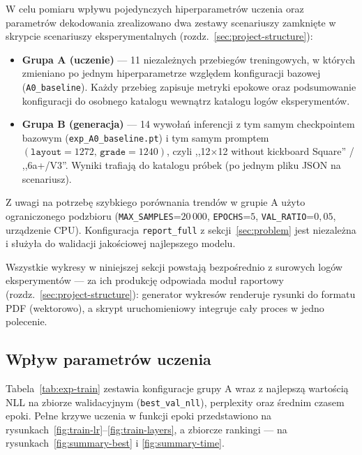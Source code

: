 \documentclass[12pt,a4paper]{article}
\begin{document}
W celu pomiaru wpływu pojedynczych hiperparametrów uczenia oraz parametrów dekodowania zrealizowano dwa zestawy scenariuszy zamknięte w skrypcie scenariuszy eksperymentalnych (rozdz.~\ref{sec:project-structure}):
\begin{itemize}[leftmargin=1.5em]
    \item \textbf{Grupa A (uczenie)} --- 11 niezależnych przebiegów treningowych, w których zmieniano po jednym hiperparametrze względem konfiguracji bazowej (\texttt{A0\_baseline}). Każdy przebieg zapisuje metryki epokowe oraz podsumowanie konfiguracji do osobnego katalogu wewnątrz katalogu logów eksperymentów.
    \item \textbf{Grupa B (generacja)} --- 14 wywołań inferencji z tym samym checkpointem bazowym (\texttt{exp\_A0\_baseline.pt}) i tym samym promptem $(\texttt{layout}=1272,\,\texttt{grade}=1240)$, czyli ,,12$\times$12 without kickboard Square'' / ,,6a+/V3''. Wyniki trafiają do katalogu próbek (po jednym pliku JSON na scenariusz).
\end{itemize}
Z uwagi na potrzebę szybkiego porównania trendów w grupie A użyto ograniczonego podzbioru (\texttt{MAX\_SAMPLES}=$20\,000$, \texttt{EPOCHS}=$5$, \texttt{VAL\_RATIO}=$0{,}05$, urządzenie CPU). Konfiguracja \texttt{report\_full} z sekcji~\ref{sec:problem} jest niezależna i służyła do walidacji jakościowej najlepszego modelu.

Wszystkie wykresy w niniejszej sekcji powstają bezpośrednio z surowych logów eksperymentów --- za ich produkcję odpowiada moduł raportowy (rozdz.~\ref{sec:project-structure}): generator wykresów renderuje rysunki do formatu PDF (wektorowo), a skrypt uruchomieniowy integruje cały proces w jedno polecenie.

\subsection{Wpływ parametrów uczenia}
\label{sec:exp-train}

Tabela~\ref{tab:exp-train} zestawia konfiguracje grupy A wraz z najlepszą wartością NLL na zbiorze walidacyjnym (\texttt{best\_val\_nll}), perplexity oraz średnim czasem epoki. Pełne krzywe uczenia w funkcji epoki przedstawiono na rysunkach~\ref{fig:train-lr}--\ref{fig:train-layers}, a zbiorcze rankingi --- na rysunkach~\ref{fig:summary-best} i \ref{fig:summary-time}.
\end{document}
